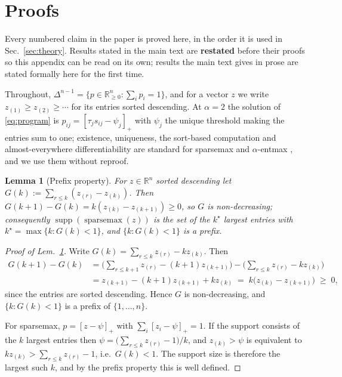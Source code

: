 \documentclass{article}
\newtheorem{lemma}{Lemma}
\newcommand{\simplex}{\Delta}
\newcommand{\supp}{\operatorname{supp}}
\begin{document}
\section{Proofs}
\label{app:proofs}

Every numbered claim in the paper is proved here, in the order it is used in
Sec.~\ref{sec:theory}. Results stated in the main text are \textbf{restated} before their proofs
so this appendix can be read on its own; results the main text gives in prose are stated formally
here for the first time.

Throughout, $\simplex^{n-1}=\{p\in\mathbb{R}^n_{\ge0}:\sum_i p_i=1\}$, and for a vector $z$ we
write $z_{(1)}\ge z_{(2)}\ge\cdots$ for its entries sorted descending. At $\alpha=2$ the solution
of \eqref{eq:program} is $p_{ij}=[\tau_j s_{ij}-\psi_j]_+$ with $\psi_j$ the unique threshold
making the entries sum to one; existence, uniqueness, the sort-based computation and almost-everywhere
differentiability are standard for sparsemax and $\alpha$-entmax
\citep{martins2016softmax,peters2019sparse}, and we use them without reproof.

\begin{lemma}[Prefix property]
\label{lem:prefix}
For $z\in\mathbb{R}^n$ sorted descending let $G(k):=\sum_{r\le k}(z_{(r)}-z_{(k)})$. Then
$G(k{+}1)-G(k)=k(z_{(k)}-z_{(k+1)})\ge0$, so $G$ is non-decreasing; consequently
$\supp(\operatorname{sparsemax}(z))$ is the set of the $k^\star$ largest entries with
$k^\star=\max\{k:G(k)<1\}$, and $\{k:G(k)<1\}$ is a prefix.
\end{lemma}

\begin{proof}[Proof of Lem.~\ref{lem:prefix}]
Write $G(k) = \sum_{r\leq k} z_{(r)} - k z_{(k)}$. Then
\begin{align*}
G(k{+}1) - G(k)
&= \Big(\sum_{r \leq k+1} z_{(r)} - (k{+}1) z_{(k+1)}\Big) - \Big(\sum_{r\leq k} z_{(r)} - k z_{(k)}\Big)\\
&= z_{(k+1)} - (k{+}1)z_{(k+1)} + k z_{(k)}
\;=\; k\big(z_{(k)} - z_{(k+1)}\big) \;\geq\; 0,
\end{align*}
since the entries are sorted descending. Hence $G$ is non-decreasing, and
$\{k : G(k) < 1\}$ is a prefix of $\{1,\dots,n\}$.

For sparsemax, $p = [z - \psi]_+$ with $\sum_i [z_i - \psi]_+ = 1$. If the support consists of
the $k$ largest entries then $\psi = \big(\sum_{r\leq k} z_{(r)} - 1\big)/k$, and $z_{(k)} > \psi$
is equivalent to $k z_{(k)} > \sum_{r\leq k} z_{(r)} - 1$, i.e.\ $G(k) < 1$. The support size
is therefore the largest such $k$, and by the prefix property this is well defined.
\end{proof}
\end{document}
